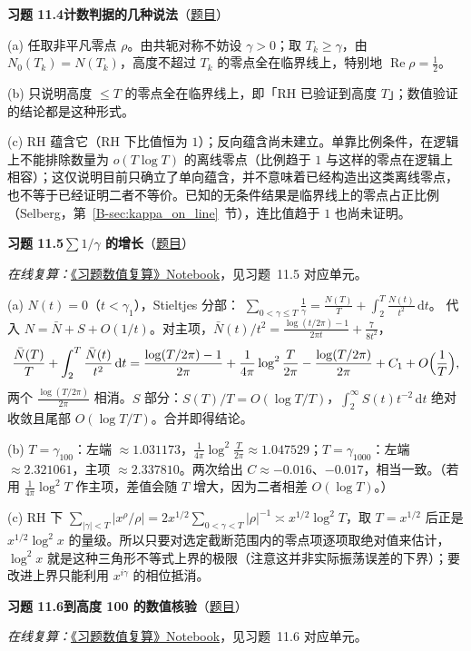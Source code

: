 \documentclass[11pt,a4paper]{article}
\newcommand{\dd}{\,\mathrm{d}}
\renewcommand{\Re}{\operatorname{Re}}
\newcommand{\bref}[1]{\ref*{B-#1}}
\newcommand{\Sol}[2]{%
  \par\addvspace{1.2em}\noindent
  \hypertarget{s:#1}{}\textbf{习题 #1\quad #2}\hfill{\small（\hyperlink{q:#1}{题目}）}\par
  \nopagebreak\smallskip}
\begin{document}
\Sol{11.4}{计数判据的几种说法}
(a) 任取非平凡零点 $\rho$。由共轭对称不妨设 $\gamma>0$；取 $T_k\ge\gamma$，由 $N_0(T_k)=N(T_k)$，高度不超过 $T_k$ 的零点全在临界线上，特别地 $\Re\rho=\frac12$。

(b) 只说明高度 $\le T$ 的零点全在临界线上，即「RH 已验证到高度 $T$」；数值验证的结论都是这种形式。

(c) RH 蕴含它（RH 下比值恒为 $1$）；反向蕴含尚未建立。单靠比例条件，在逻辑上不能排除数量为 $o(T\log T)$ 的离线零点（比例趋于 $1$ 与这样的零点在逻辑上相容）；这仅说明目前只确立了单向蕴含，并不意味着已经构造出这类离线零点，也不等于已经证明二者不等价。已知的无条件结果是临界线上的零点占正比例（Selberg，第~\bref{sec:kappa_on_line}~节），连比值趋于 $1$ 也尚未证明。

\Sol{11.5}{$\sum1/\gamma$ 的增长}
\emph{在线复算：}\href{https://colab.research.google.com/github/lichengtong123/lichengtong-RH/blob/main/\%E4\%B9\%A0\%E9\%A2\%98\%E4\%B8\%8E\%E8\%A7\%A3\%E7\%AD\%94/\%E4\%B9\%A0\%E9\%A2\%98\%E6\%95\%B0\%E5\%80\%BC\%E5\%A4\%8D\%E7\%AE\%97.ipynb}{《习题数值复算》Notebook}，见习题~11.5 对应单元。

(a) $N(t)=0$（$t<\gamma_1$），Stieltjes 分部：
$\sum_{0<\gamma\le T}\frac1\gamma=\frac{N(T)}T+\int_{2}^T\frac{N(t)}{t^2}\dd t$。
代入 $N=\bar N+S+O(1/t)$。对主项，$\bar N(t)/t^2=\frac{\log(t/2\pi)-1}{2\pi t}+\frac7{8t^2}$，
\[
  \frac{\bar N(T)}T+\int_2^T\frac{\bar N(t)}{t^2}\dd t
  =\frac{\log(T/2\pi)-1}{2\pi}+\frac1{4\pi}\log^2\frac T{2\pi}-\frac{\log(T/2\pi)}{2\pi}+C_1+O\Bigl(\frac1T\Bigr),
\]
两个 $\frac{\log(T/2\pi)}{2\pi}$ 相消。$S$ 部分：$S(T)/T=O(\log T/T)$，$\int_2^\infty S(t)t^{-2}\dd t$ 绝对收敛且尾部 $O(\log T/T)$。合并即得结论。

(b) $T=\gamma_{100}$：左端 $\approx1.031173$，$\frac1{4\pi}\log^2\frac T{2\pi}\approx1.047529$；$T=\gamma_{1000}$：左端 $\approx2.321061$，主项 $\approx2.337810$。两次给出 $C\approx-0.016$、$-0.017$，相当一致。（若用 $\frac1{4\pi}\log^2T$ 作主项，差值会随 $T$ 增大，因为二者相差 $O(\log T)$。）

(c) RH 下 $\sum_{|\gamma|<T}|x^\rho/\rho|=2x^{1/2}\sum_{0<\gamma<T}|\rho|^{-1}\asymp x^{1/2}\log^2T$，取 $T=x^{1/2}$ 后正是 $x^{1/2}\log^2x$ 的量级。所以只要对选定截断范围内的零点项逐项取绝对值来估计，$\log^2x$ 就是这种三角形不等式上界的极限（注意这并非实际振荡误差的下界）；要改进上界只能利用 $x^{i\gamma}$ 的相位抵消。

\Sol{11.6}{到高度 100 的数值核验}
\emph{在线复算：}\href{https://colab.research.google.com/github/lichengtong123/lichengtong-RH/blob/main/\%E4\%B9\%A0\%E9\%A2\%98\%E4\%B8\%8E\%E8\%A7\%A3\%E7\%AD\%94/\%E4\%B9\%A0\%E9\%A2\%98\%E6\%95\%B0\%E5\%80\%BC\%E5\%A4\%8D\%E7\%AE\%97.ipynb}{《习题数值复算》Notebook}，见习题~11.6 对应单元。
\end{document}
